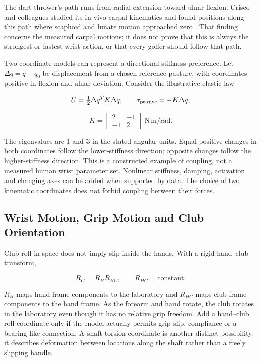 The dart-thrower's path runs from radial extension toward ulnar flexion. Crisco and colleagues studied its in vivo carpal kinematics and found positions along this path where scaphoid and lunate motion approached zero \citep{Crisco2005Dart}. That finding concerns the measured carpal motions; it does not prove that this is always the strongest or fastest wrist action, or that every golfer should follow that path.

Two-coordinate models can represent a directional stiffness preference. Let \(\Delta q=q-q_0\) be displacement from a chosen reference posture, with coordinates positive in flexion and ulnar deviation. Consider the illustrative elastic law

\[
U=\tfrac12\Delta q^T K\Delta q,\qquad
\tau_{\rm passive}=-K\Delta q,
\]

\[
K=\begin{bmatrix}2&-1\\-1&2\end{bmatrix}
\ \mathrm{N\,m/rad}.
\]

The eigenvalues are 1 and 3 in the stated angular units. Equal positive changes in both coordinates follow the lower-stiffness direction; opposite changes follow the higher-stiffness direction. This is a constructed example of coupling, not a measured human wrist parameter set. Nonlinear stiffness, damping, activation and changing axes can be added when supported by data. The choice of two kinematic coordinates does not forbid coupling between their forces.

\subsection{Wrist Motion, Grip Motion and Club Orientation}\label{wrist-motion-grip-motion-and-club-orientation}

Club roll in space does not imply slip inside the hands. With a rigid hand--club transform,

\[
R_C=R_H R_{HC},\qquad R_{HC}=\text{constant}.
\]

\(R_H\) maps hand-frame components to the laboratory and \(R_{HC}\) maps club-frame components to the hand frame. As the forearm and hand rotate, the club rotates in the laboratory even though it has no relative grip freedom. Add a hand--club roll coordinate only if the model actually permits grip slip, compliance or a bearing-like connection. A shaft-torsion coordinate is another distinct possibility: it describes deformation between locations along the shaft rather than a freely slipping handle.

